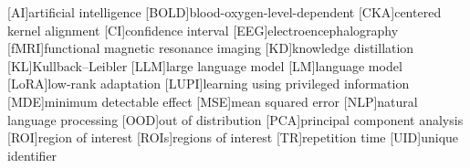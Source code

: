 [AI]{artificial intelligence}
[BOLD]{blood-oxygen-level-dependent}
[CKA]{centered kernel alignment}
[CI]{confidence interval}
[EEG]{electroencephalography}
[fMRI]{functional magnetic resonance imaging}
[KD]{knowledge distillation}
[KL]{Kullback--Leibler}
[LLM]{large language model}
[LM]{language model}
[LoRA]{low-rank adaptation}
[LUPI]{learning using privileged information}
[MDE]{minimum detectable effect}
[MSE]{mean squared error}
[NLP]{natural language processing}
[OOD]{out of distribution}
[PCA]{principal component analysis}
[ROI]{region of interest}
[ROIs]{regions of interest}
[TR]{repetition time}
[UID]{unique identifier}
